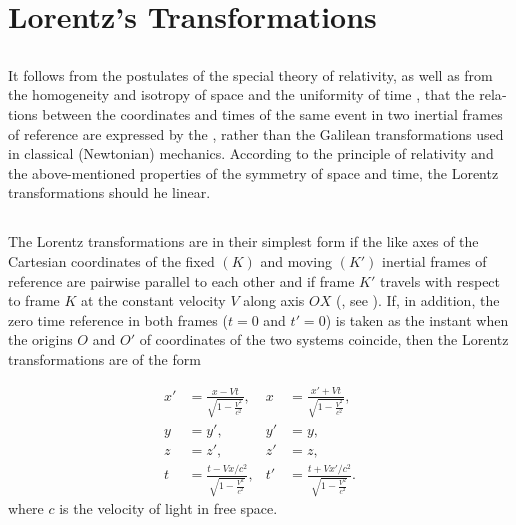 \section{Lorentz's Transformations}
\label{sec-5.3}

\subsection{}\label{5.3.1} It follows from the postulates of the special theory of relativity, as well as from the homogeneity  and isotropy  of space and the uniformity of time , that the rela­tions between the coordinates and times of the same event in two inertial frames of reference are expressed by the , rather than the Galilean transformations  used in classical (Newtonian) mechanics. According to the prin­ciple of relativity and the above-mentioned properties of the symmetry of space and time, the Lorentz transformations should he linear.

\subsection{}\label{5.3.2} The Lorentz transformations are in their simplest form if the like axes of the Cartesian coordinates of the fixed $(K)$ and moving $(K')$ inertial frames of reference are pairwise paral­lel to each other and if frame $K'$ travels with respect to frame $K$ at the constant velocity $V$ along axis $OX$ (, see ). If, in addition, the zero time reference in both frames ($t = 0$ and $t' = 0$) is taken as the instant when the origins $O$ and $O'$ of coordinates of the two systems coincide, then the Lorentz transformations are of the form

\begin{align*}%
x' & = \frac{x - Vt}{\sqrt{1 - \frac{V^{2}}{c^{2}}}}, & x  &= \frac{x' + Vt}{\sqrt{1 - \frac{V^{2}}{c^{2}}}}, \\
y & = y', &  y' & = y, \\
z & = z', &  z' & = z, \\
t & = \frac{t - Vx/c^{2}}{\sqrt{1 - \frac{V^{2}}{c^{2}}}}, &  t' &= \frac{t + Vx'/c^{2}}{\sqrt{1 - \frac{V^{2}}{c^{2}}}}.
\end{align*}
where $c$ is the velocity of light in free space.


